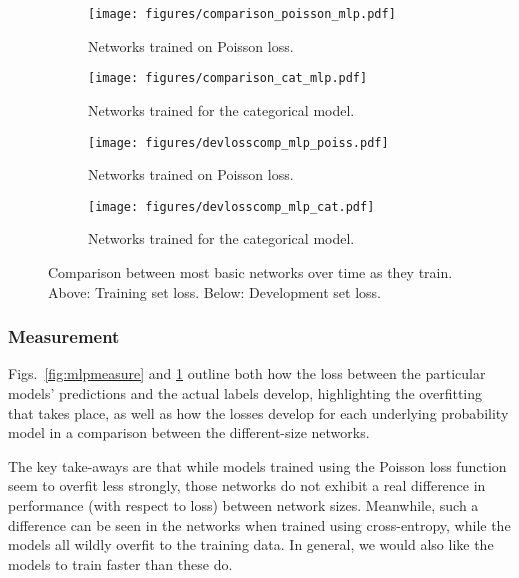 \documentclass[10pt, twoside, a4paper]{article}
\begin{document}
	\begin{figure}
	\begin{center}
	\begin{subfigure}[b]{8.5cm}
	\texttt{[image: figures/comparison\_poisson\_mlp.pdf]}
	\caption{Networks trained on Poisson loss.}
	\end{subfigure}
	\begin{subfigure}[b]{7.5cm}
	\texttt{[image: figures/comparison\_cat\_mlp.pdf]}
	\caption{Networks trained for the categorical model.}
	\end{subfigure}
	\begin{subfigure}[b]{8.5cm}
	\texttt{[image: figures/devlosscomp\_mlp\_poiss.pdf]}
	\caption{Networks trained on Poisson loss.}
	\end{subfigure}
	\begin{subfigure}[b]{7.5cm}
	\texttt{[image: figures/devlosscomp\_mlp\_cat.pdf]}
	\caption{Networks trained for the categorical model.}
	\end{subfigure}
	\end{center}
	\caption{Comparison between most basic networks over time as they train. Above: Training set loss. Below: Development set loss.}
	\label{fig:mlpconv}
	
	\end{figure}


	\subsubsection{Measurement}

	Figs.\ \ref{fig:mlpmeasure} and 
	\ref{fig:mlpconv} outline both how the loss between the particular models' predictions and the actual 
	labels develop, highlighting the overfitting that takes place, as well as how the losses 
	develop for each underlying probability model in a comparison between the different-size 
	networks.

	The key take-aways are that while models trained using the Poisson loss function seem to 
	overfit less strongly, those networks do not exhibit a real difference in performance
	(with respect to loss) between network sizes. Meanwhile, such a difference 
	can be seen in the networks when trained using cross-entropy, while the models all wildly
	overfit to the training data. In general, we would also like the models to train faster 
	than these do. 
\end{document}
